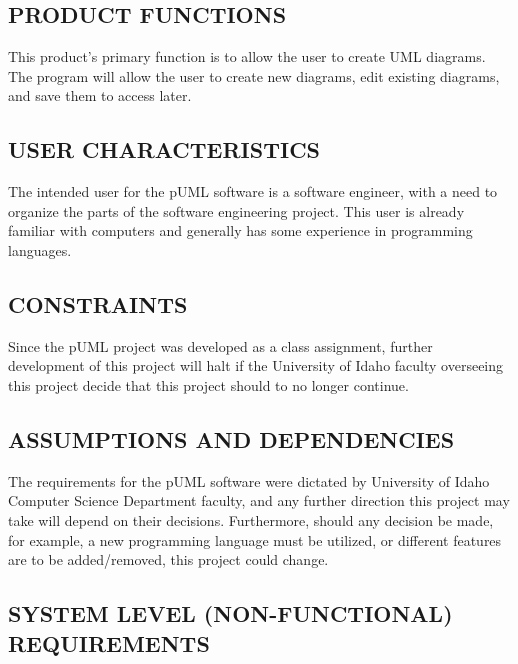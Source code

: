 \documentclass[twoside,letterpaper]{article}
\begin{document}
\subsection[PRODUCT FUNCTIONS]{\rmfamily\bfseries\color{black}
PRODUCT FUNCTIONS}
{\color{black}
This product's primary function is to allow the user to create UML diagrams.  
The program will allow the user to create new diagrams, edit existing diagrams, and save them to access later.
}

\subsection[USER CHARACTERISTICS]{\rmfamily\bfseries\color{black}
USER CHARACTERISTICS}
{\color{black}
The intended user for the pUML software is a software engineer, with a need to organize
the parts of the software engineering project. This user is already familiar with
computers and generally has some experience in programming languages.
}

\subsection[CONSTRAINTS]{\rmfamily\bfseries\color{black}
CONSTRAINTS}
{\color{black}
Since the pUML project was developed as a class assignment,
further development of this project will halt if the University of Idaho
faculty overseeing this project decide that this project should to no longer continue.
}

\subsection[ASSUMPTIONS AND DEPENDENCIES]{\rmfamily\bfseries\color{black}
ASSUMPTIONS AND DEPENDENCIES}
{\color{black}
The requirements for the pUML software were dictated by University of Idaho Computer Science
Department faculty, and any further direction this project may take will depend on their decisions.  
Furthermore, should any decision be made, for example,  a new programming language must be utilized,
or different features are to be added/removed, this project could change.
}




\subsection[SYSTEM LEVEL (NON{}-FUNCTIONAL)
REQUIREMENTS]{\rmfamily\bfseries\color{black}
SYSTEM LEVEL (NON-FUNCTIONAL) REQUIREMENTS}
\end{document}
